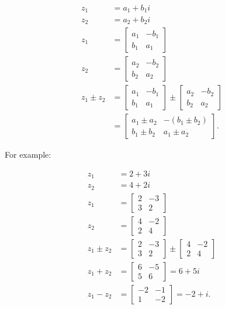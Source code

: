 \documentclass[10pt]{article}
\begin{document}
$$
\begin{aligned}
z_{1} & =a_{1}+b_{1} i \\
z_{2} & =a_{2}+b_{2} i \\
z_{1} & =\left[\begin{array}{cc}
a_{1} & -b_{1} \\
b_{1} & a_{1}
\end{array}\right] \\
z_{2} & =\left[\begin{array}{cc}
a_{2} & -b_{2} \\
b_{2} & a_{2}
\end{array}\right] \\
z_{1} \pm z_{2} & =\left[\begin{array}{cc}
a_{1} & -b_{1} \\
b_{1} & a_{1}
\end{array}\right] \pm\left[\begin{array}{cc}
a_{2} & -b_{2} \\
b_{2} & a_{2}
\end{array}\right] \\
& =\left[\begin{array}{ll}
a_{1} \pm a_{2} & -\left(b_{1} \pm b_{2}\right) \\
b_{1} \pm b_{2} & a_{1} \pm a_{2}
\end{array}\right] .
\end{aligned}
$$

For example:

$$
\begin{aligned}
z_{1} & =2+3 i \\
z_{2} & =4+2 i \\
z_{1} & =\left[\begin{array}{cc}
2 & -3 \\
3 & 2
\end{array}\right] \\
z_{2} & =\left[\begin{array}{cc}
4 & -2 \\
2 & 4
\end{array}\right] \\
z_{1} \pm z_{2} & =\left[\begin{array}{cc}
2 & -3 \\
3 & 2
\end{array}\right] \pm\left[\begin{array}{cc}
4 & -2 \\
2 & 4
\end{array}\right] \\
z_{1}+z_{2} & =\left[\begin{array}{cc}
6 & -5 \\
5 & 6
\end{array}\right]=6+5 i \\
z_{1}-z_{2} & =\left[\begin{array}{cc}
-2 & -1 \\
1 & -2
\end{array}\right]=-2+i .
\end{aligned}
$$
\end{document}
